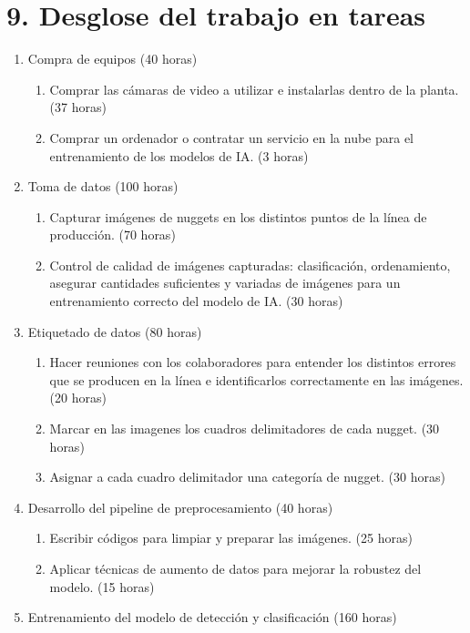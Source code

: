 \documentclass[
11pt, %
]{charter}
\begin{document}
\section{9. Desglose del trabajo en tareas}
\label{sec:wbs}

\begin{enumerate}
\item Compra de equipos (40 horas)
	\begin{enumerate}
	\item Comprar las cámaras de video a utilizar e instalarlas dentro de la planta. (37 horas)
	\item Comprar un ordenador o contratar un servicio en la nube para el entrenamiento de los modelos de IA. (3 horas)
	\end{enumerate}
\item Toma de datos (100 horas)
	\begin{enumerate}
	\item Capturar imágenes de nuggets en los distintos puntos de la línea de producción. (70 horas)
	\item Control de calidad de imágenes capturadas: clasificación, ordenamiento, asegurar cantidades suficientes y variadas de imágenes para un entrenamiento correcto del modelo de IA. (30 horas)
	\end{enumerate}
\item Etiquetado de datos (80 horas)
	\begin{enumerate}
	\item Hacer reuniones con los colaboradores para entender los distintos errores que se producen en la línea e identificarlos correctamente en las imágenes. (20 horas)
	\item Marcar en las imagenes los cuadros delimitadores de cada nugget. (30 horas)
	\item Asignar a cada cuadro delimitador una categoría de nugget. (30 horas)
	\end{enumerate}
\item Desarrollo del pipeline de preprocesamiento (40 horas)
	\begin{enumerate}
	\item Escribir códigos para limpiar y preparar las imágenes. (25 horas)
	\item Aplicar técnicas de aumento de datos para mejorar la robustez del modelo. (15 horas)
	\end{enumerate}
\item Entrenamiento del modelo de detección y clasificación (160 horas)
	\begin{enumerate}

\end{enumerate}
\end{enumerate}
\end{document}
